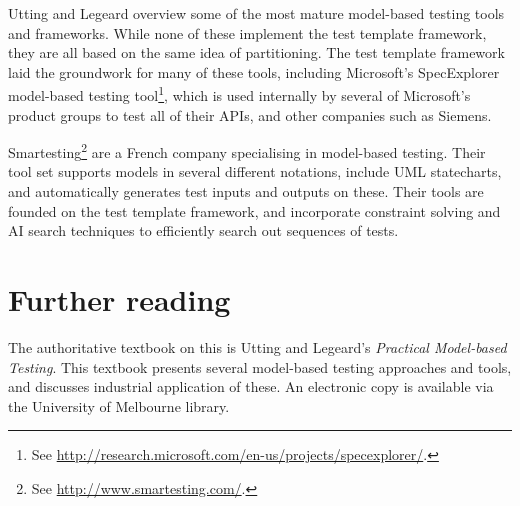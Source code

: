 Utting and Legeard \cite{utting07} overview some of the most mature model-based testing tools and frameworks. While none of these implement the test template framework, they are all based on the same idea of partitioning. The test template framework laid the groundwork for many of these tools, including Microsoft's SpecExplorer model-based testing tool\footnote{See \url{http://research.microsoft.com/en-us/projects/specexplorer/}.}, which is used internally by several of Microsoft's product groups to test all of their APIs, and other companies such as Siemens.

Smartesting\footnote{See \url{http://www.smartesting.com/}.} are a French company specialising in model-based testing. Their tool set supports models in several different notations, include UML statecharts, and automatically generates test inputs and outputs on these. Their tools are founded on the test template framework, and incorporate constraint solving and AI search techniques to efficiently search out sequences of tests.

\section{Further reading}

The authoritative textbook on this is Utting and Legeard's  \cite{utting07} \emph{Practical Model-based Testing}. This textbook presents several model-based testing approaches and tools, and discusses industrial application of these. An electronic copy is available via the University of Melbourne library.





